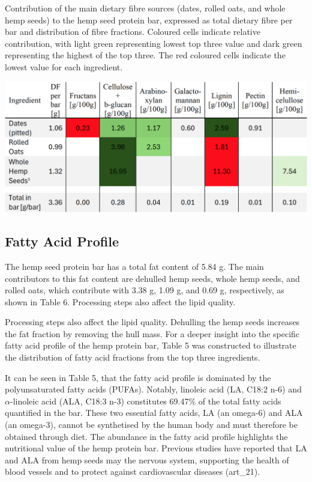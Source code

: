 \begin{table}[H]
    \centering
    \caption{Contribution of the main dietary fibre sources (dates, rolled oats, and whole hemp seeds) to the hemp seed protein bar,
    expressed as total dietary fibre per bar and distribution of fibre fractions. Coloured cells indicate relative contribution, with light
    green representing lowest top three value and dark green representing the highest of the top three. The red coloured cells indicate the
    lowest value for each ingredient.}
    \label{tab:df_tab_01}
    \includegraphics[width=\linewidth]{Figures/tab_df_01.png}
\end{table}

\subsection{Fatty Acid Profile}
The hemp seed protein bar has a total fat content of 5.84 g. The main contributors to this fat content
are dehulled hemp seeds, whole hemp seeds, and rolled oats, which contribute with 3.38 g, 1.09 g,
and 0.69 g, respectively, as shown in Table 6. Processing steps also affect the lipid quality.

\vspace{1em}
Processing steps also affect the lipid quality. Dehulling the hemp seeds increases the fat fraction by removing the hull mass. For a deeper insight into the specific fatty acid profile of the hemp protein bar, Table 5 was constructed to illustrate the distribution of fatty acid fractions from the top three ingredients. 

\vspace{1em}
It can be seen in Table 5, that the fatty acid profile is dominated by the polyunsaturated fatty acids (PUFAs). Notably, linoleic acid (LA, C18:2 n-6) and $\alpha$-linoleic acid (ALA, C18:3 n-3) constitutes 69.47\% of the total fatty acids quantified in the bar. These two essential fatty acids, LA (an omega-6) and ALA (an omega-3), cannot be synthetised by the human body and must therefore be obtained through diet. The abundance in the fatty acid profile highlights the nutritional value of the hemp protein bar. Previous studies have reported that LA and ALA from hemp seeds may the nervous system, supporting the health of blood vessels and to protect against cardiovascular diseases (art\_21). 

